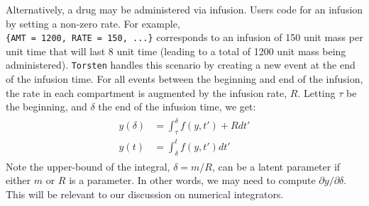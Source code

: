 \documentclass[11pt]{article}
\begin{document}
Alternatively, a drug may be administered via infusion.
Users code for an infusion by setting a non-zero rate. For example,  \\
\hbox{\texttt{\{AMT = 1200, RATE = 150, ...\}}} corresponds to an infusion of 150 unit mass per unit
time that will last 8 unit time (leading to a total of 1200 unit mass being administered). \texttt{Torsten} handles
this scenario by creating a new event at the end of the infusion time. For all events between the
beginning and end of the infusion, the rate in each compartment is augmented by the infusion rate,
$R$. Letting $\tau$ be the beginning, and $\delta$ the end of the infusion time, we get:
%
\begin{eqnarray}
  \begin{aligned}
  y(\delta) &= \int_\tau ^ \delta f(y, t') + R dt' \\
  y(t) &= \int_\delta ^ t f(y, t') dt'
  \end{aligned}
\end{eqnarray}
%
Note the upper-bound of the integral, $\delta = m / R$, can be a latent parameter if either $m$ or
$R$ is a parameter. In other words, we may need to compute $\partial y / \partial \delta$. This will
be relevant to our discussion on numerical integrators.
\end{document}
